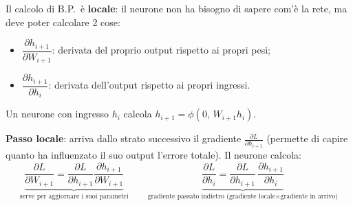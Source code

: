 \documentclass[11pt,a4paper]{article}
\begin{document}
Il calcolo di B.P.\ è \textbf{locale}: il neurone non ha bisogno di sapere com'è la rete, ma deve poter calcolare 2 cose:
\begin{itemize}
  \item $\dfrac{\partial h_{i+1}}{\partial W_{i+1}}$: derivata del proprio output rispetto ai propri pesi;
  \item $\dfrac{\partial h_{i+1}}{\partial h_i}$: derivata dell'output rispetto ai propri ingressi.
\end{itemize}
Un neurone con ingresso $h_i$ calcola $h_{i+1} = \phi(0,\, W_{i+1}h_i)$.

\begin{center}
\end{center}

\textbf{Passo locale}: arriva dallo strato successivo il gradiente $\frac{\partial L}{\partial h_{i+1}}$ (permette di capire quanto ha influenzato il suo output l'errore totale). Il neurone calcola:
\[
\underbrace{\frac{\partial L}{\partial W_{i+1}} = \frac{\partial L}{\partial h_{i+1}}\frac{\partial h_{i+1}}{\partial W_{i+1}}}_{\text{serve per aggiornare i suoi parametri}}
\qquad
\underbrace{\frac{\partial L}{\partial h_i} = \frac{\partial L}{\partial h_{i+1}}\,\frac{\partial h_{i+1}}{\partial h_i}}_{\text{gradiente passato indietro (gradiente locale} \times \text{gradiente in arrivo)}}
\]

\begin{center}
\end{center}
\end{document}
